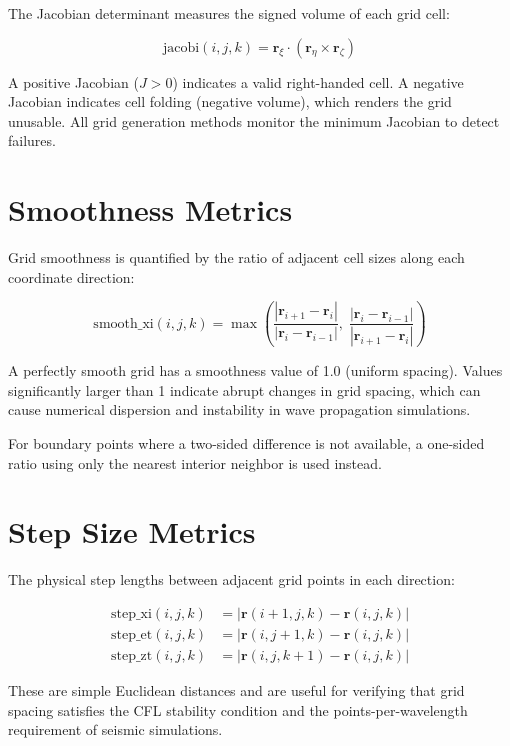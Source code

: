 \documentclass[11pt,a4paper]{report}
\newcommand{\rvec}{\bm{r}}
\begin{document}
The Jacobian determinant measures the signed volume of each grid cell:

\begin{equation}
    \text{jacobi}(i,j,k) = \rvec_\xi \cdot (\rvec_\eta \times \rvec_\zeta)
\end{equation}

A positive Jacobian ($J > 0$) indicates a valid right-handed cell. A negative Jacobian indicates cell folding (negative volume), which renders the grid unusable. All grid generation methods monitor the minimum Jacobian to detect failures.

\section{Smoothness Metrics}

Grid smoothness is quantified by the ratio of adjacent cell sizes along each coordinate direction:

\begin{equation}
    \text{smooth\_xi}(i,j,k) = \max\left( \frac{|\rvec_{i+1} - \rvec_i|}{|\rvec_i - \rvec_{i-1}|}, \; \frac{|\rvec_i - \rvec_{i-1}|}{|\rvec_{i+1} - \rvec_i|} \right)
\end{equation}

A perfectly smooth grid has a smoothness value of 1.0 (uniform spacing). Values significantly larger than 1 indicate abrupt changes in grid spacing, which can cause numerical dispersion and instability in wave propagation simulations.

For boundary points where a two-sided difference is not available, a one-sided ratio using only the nearest interior neighbor is used instead.

\section{Step Size Metrics}

The physical step lengths between adjacent grid points in each direction:

\begin{align}
    \text{step\_xi}(i,j,k) &= |\rvec(i+1,j,k) - \rvec(i,j,k)| \\
    \text{step\_et}(i,j,k) &= |\rvec(i,j+1,k) - \rvec(i,j,k)| \\
    \text{step\_zt}(i,j,k) &= |\rvec(i,j,k+1) - \rvec(i,j,k)|
\end{align}

These are simple Euclidean distances and are useful for verifying that grid spacing satisfies the CFL stability condition and the points-per-wavelength requirement of seismic simulations.
\end{document}
